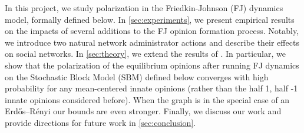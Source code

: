 In this project, we study polarization in the Friedkin-Johnson (FJ) dynamics model, formally defined below.
In \cref{sec:experiments}, we present empirical results
on the impacts of several additions to the FJ opinion formation
process.
Notably, we introduce two natural network administrator
actions and describe their effects on social networks.
In \cref{sec:theory}, we extend the results of
\cite{chitra20analyzing}.
In particular, we show that the polarization of the
equilibrium opinions after running FJ dynamics
on the Stochastic Block Model (SBM) defined below
converges with high probability for any mean-centered
innate opinions (rather than the half 1, half -1 innate
opinions considered before).
When the graph is in the special case of 
an Erdős–Rényi our bounds are even stronger.
Finally, we discuss our work and provide directions
for future work in \cref{sec:conclusion}.



